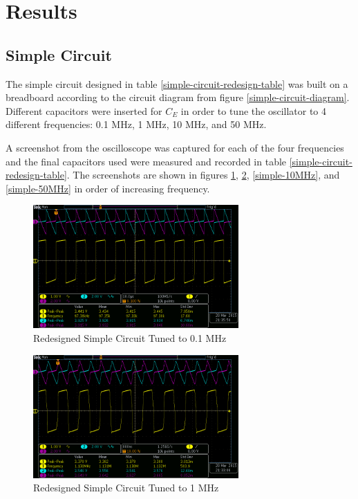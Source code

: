 \documentclass[titlepage, letterpaper, 10.5pt]{article}
\begin{document}
\section{Results}

\subsection{Simple Circuit}

The simple circuit designed in table \ref{simple-circuit-redesign-table}
was built on a breadboard according to the circuit diagram from figure
\ref{simple-circuit-diagram}. Different capacitors were inserted for $C_{E}$
in order to tune the oscillator to 4 different frequencies: 0.1 MHz, 1 MHz, 10 MHz, and 50 MHz.

A screenshot from the oscilloscope was captured for each of the four frequencies and the final
capacitors used were measured and recorded in table
\ref{simple-circuit-redesign-table}. The screenshots are shown in figures \ref{simple-100kHz},
\ref{simple-1MHz}, \ref{simple-10MHz}, and \ref{simple-50MHz} in order of increasing frequency.

\begin{figure}[ht]
	\centering
	\includegraphics[width=0.7\textwidth]{results/simple-100kHz}
	\caption{Redesigned Simple Circuit Tuned to 0.1 MHz}
	\label{simple-100kHz}
\end{figure}

\begin{figure}[ht]
	\centering
	\includegraphics[width=0.7\textwidth]{results/simple-1MHz}
	\caption{Redesigned Simple Circuit Tuned to 1 MHz}
	\label{simple-1MHz}
\end{figure}
\end{document}
